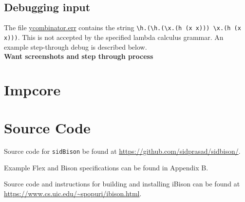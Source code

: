 \subsection{Debugging input}

The file \href{https://github.com/sidprasad/sidbison/blob/master/lambdacalcexample/input/ycombinator.err} {ycombinator.err} contains the string \verb|\h.(\h.(\x.(h (x x))) \x.(h (x x)))|. This is not accepted by the specified lambda calculus grammar. An example step-through debug is described below.\\


\textbf{Want screenshots and step through process}

\section{Impcore}

\section{Source Code}

Source code for \verb|sidBison| be found at \url{https://github.com/sidprasad/sidbison/}. 

\noindent
Example Flex and Bison specifications can be found in Appendix B.

\noindent
 Source code and instructions for building and installing iBison can be found at \url{https://www.cs.uic.edu/~spopuri/ibison.html}.